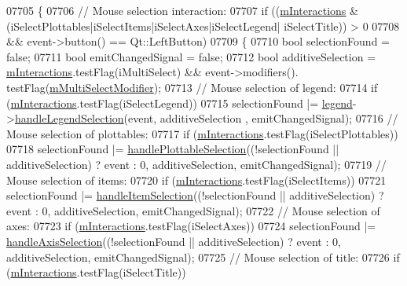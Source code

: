 \begin{DoxyCode}
07705   \{
07706     \textcolor{comment}{// Mouse selection interaction:}
07707     \textcolor{keywordflow}{if} ((\hyperlink{a00116_af8d040767753acc548b2368dd4150ae6}{mInteractions} & (iSelectPlottables|iSelectItems|iSelectAxes|iSelectLegend|
      iSelectTitle)) > 0 
07708         && event->button() == Qt::LeftButton)
07709     \{
07710       \textcolor{keywordtype}{bool} selectionFound = \textcolor{keyword}{false};
07711       \textcolor{keywordtype}{bool} emitChangedSignal = \textcolor{keyword}{false};
07712       \textcolor{keywordtype}{bool} additiveSelection = \hyperlink{a00116_af8d040767753acc548b2368dd4150ae6}{mInteractions}.testFlag(iMultiSelect) && \textcolor{keyword}{event}->modifiers().
      testFlag(\hyperlink{a00116_a690dbabf892af5969b09e9f69bb83a9b}{mMultiSelectModifier});
07713       \textcolor{comment}{// Mouse selection of legend:}
07714       \textcolor{keywordflow}{if} (\hyperlink{a00116_af8d040767753acc548b2368dd4150ae6}{mInteractions}.testFlag(iSelectLegend))
07715         selectionFound |= \hyperlink{a00116_a75acd427ec48e9a9d2ae6a17817cc490}{legend}->\hyperlink{a00045_a44cdc6af6cd6e62a2bd827c3236c7261}{handleLegendSelection}(event, additiveSelection
      , emitChangedSignal);
07716       \textcolor{comment}{// Mouse selection of plottables:}
07717       \textcolor{keywordflow}{if} (\hyperlink{a00116_af8d040767753acc548b2368dd4150ae6}{mInteractions}.testFlag(iSelectPlottables))
07718         selectionFound |= \hyperlink{a00116_a881c8652ebb912345de27687817845cf}{handlePlottableSelection}((!selectionFound || 
      additiveSelection) ? \textcolor{keyword}{event} : 0, additiveSelection, emitChangedSignal);
07719       \textcolor{comment}{// Mouse selection of items:}
07720       \textcolor{keywordflow}{if} (\hyperlink{a00116_af8d040767753acc548b2368dd4150ae6}{mInteractions}.testFlag(iSelectItems))
07721         selectionFound |= \hyperlink{a00116_aa1ad9839539b4cdf9f7da768336650f2}{handleItemSelection}((!selectionFound || additiveSelection) ? \textcolor{keyword}{
      event} : 0, additiveSelection, emitChangedSignal);
07722       \textcolor{comment}{// Mouse selection of axes:}
07723       \textcolor{keywordflow}{if} (\hyperlink{a00116_af8d040767753acc548b2368dd4150ae6}{mInteractions}.testFlag(iSelectAxes))
07724         selectionFound |= \hyperlink{a00116_a6085478fe8ba07b2a192cf8217133cb3}{handleAxisSelection}((!selectionFound || additiveSelection) ? \textcolor{keyword}{
      event} : 0, additiveSelection, emitChangedSignal);
07725       \textcolor{comment}{// Mouse selection of title:}
07726       \textcolor{keywordflow}{if} (\hyperlink{a00116_af8d040767753acc548b2368dd4150ae6}{mInteractions}.testFlag(iSelectTitle))

\end{DoxyCode}

